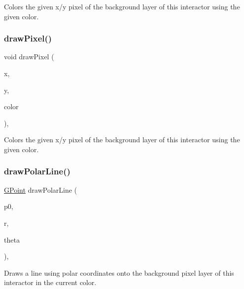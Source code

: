 Colors the given x/y pixel of the background layer of this interactor using the given color. 

\mbox{\label{classGDrawingSurface_a20abc26a94b7eb310e34abf668e0f5f4}} 
\subsubsection{\texorpdfstring{draw\+Pixel()}{drawPixel()}\hspace{0.1cm}{\footnotesize\ttfamily [3/3]}}
{\footnotesize\ttfamily void draw\+Pixel (\begin{DoxyParamCaption}\item[{double}]{x,  }\item[{double}]{y,  }\item[{const std\+::string \&}]{color }\end{DoxyParamCaption})\hspace{0.3cm}{\ttfamily [virtual]}, {\ttfamily [inherited]}}



Colors the given x/y pixel of the background layer of this interactor using the given color. 

\mbox{\label{classGDrawingSurface_af70cce1e4f708f1ed5b6f29cecb660e7}} 
\subsubsection{\texorpdfstring{draw\+Polar\+Line()}{drawPolarLine()}\hspace{0.1cm}{\footnotesize\ttfamily [1/2]}}
{\footnotesize\ttfamily \mbox{\hyperlink{classGPoint}{G\+Point}} draw\+Polar\+Line (\begin{DoxyParamCaption}\item[{const \mbox{\hyperlink{classGPoint}{G\+Point}} \&}]{p0,  }\item[{double}]{r,  }\item[{double}]{theta }\end{DoxyParamCaption})\hspace{0.3cm}{\ttfamily [virtual]}, {\ttfamily [inherited]}}



Draws a line using polar coordinates onto the background pixel layer of this interactor in the current color. 

